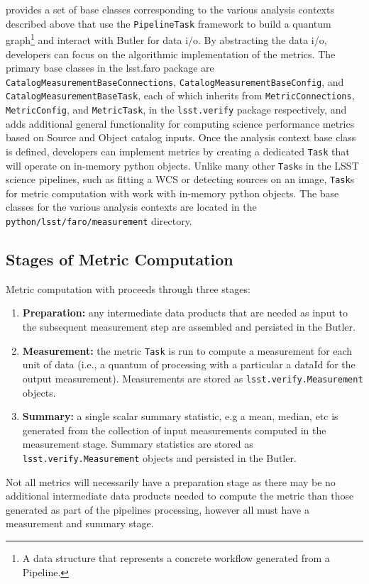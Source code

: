 \faro provides a set of base classes corresponding to the various analysis contexts described above that use the \texttt{PipelineTask} framework to build a quantum graph\footnote{A data structure that represents a concrete workflow generated from a Pipeline.} and interact with Butler for data i/o.
By abstracting the data i/o, developers can focus on the algorithmic implementation of the metrics. 
The primary base classes in the lsst.faro package are \texttt{CatalogMeasurementBaseConnections}, \texttt{CatalogMeasurementBaseConfig}, and \texttt{CatalogMeasurementBaseTask}, each of which inherits from  \texttt{MetricConnections}, \texttt{MetricConfig}, and \texttt{MetricTask}, in the \texttt{lsst.verify} package respectively, and adds additional general functionality for computing science performance metrics based on Source and Object catalog inputs. 
Once the analysis context base class is defined, developers can implement metrics by creating a dedicated \texttt{Task} that will operate on in-memory python objects. 
Unlike many other \texttt{Task}s  in the LSST science pipelines, such as fitting a WCS or detecting sources on an image, \texttt{Task}s for metric computation with \faro work with in-memory python objects.
The base classes for the various analysis contexts are located in the \texttt{python/lsst/faro/measurement} directory.

\subsection{Stages of Metric Computation} \label{ssec:stages}

Metric computation with \faro proceeds through three stages:
\begin{enumerate}
\item \textbf{Preparation:}  any intermediate data products that are needed as input to the subsequent measurement step are assembled and persisted in the Butler.	
\item \textbf{Measurement:} the metric \texttt{Task} is run to compute a measurement for each unit of data (i.e., a quantum of processing with a particular a dataId for the output measurement). Measurements are stored as \texttt{lsst.verify.Measurement} objects.
\item \textbf{Summary:}  a single scalar summary statistic, e.g a mean, median, etc is generated from the collection of input measurements computed in the measurement stage.  Summary statistics are stored as \texttt{lsst.verify.Measurement} objects and persisted in the Butler.
\end{enumerate}
Not all metrics will necessarily have a  preparation stage as there may be no additional intermediate data products needed to compute the metric than those generated as part of the pipelines processing, however all must have a measurement and summary stage. 

